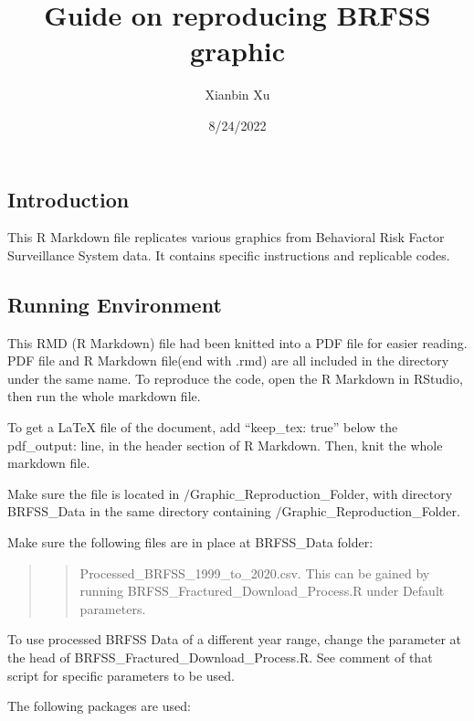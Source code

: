 \documentclass[
]{article}
\title{Guide on reproducing BRFSS graphic}
\author{Xianbin Xu}
\date{8/24/2022}
\begin{document}
\maketitle

\hypertarget{introduction}{%
\subsection{Introduction}\label{introduction}}

This R Markdown file replicates various graphics from Behavioral Risk
Factor Surveillance System data. It contains specific instructions and
replicable codes.

\hypertarget{running-environment}{%
\subsection{Running Environment}\label{running-environment}}

This RMD (R Markdown) file had been knitted into a PDF file for easier
reading. PDF file and R Markdown file(end with .rmd) are all included in
the directory under the same name. To reproduce the code, open the R
Markdown in RStudio, then run the whole markdown file.

To get a LaTeX file of the document, add ``keep\_tex: true'' below the
pdf\_output: line, in the header section of R Markdown. Then, knit the
whole markdown file.

Make sure the file is located in \(/\)Graphic\_Reproduction\_Folder,
with directory BRFSS\_Data in the same directory containing
\(/\)Graphic\_Reproduction\_Folder.

Make sure the following files are in place at BRFSS\_Data folder:

\begin{quote}
\begin{quote}
Processed\_BRFSS\_1999\_to\_2020.csv. This can be gained by running
BRFSS\_Fractured\_Download\_Process.R under Default parameters.
\end{quote}
\end{quote}

To use processed BRFSS Data of a different year range, change the
parameter at the head of BRFSS\_Fractured\_Download\_Process.R. See
comment of that script for specific parameters to be used.

The following packages are used:
\end{document}
